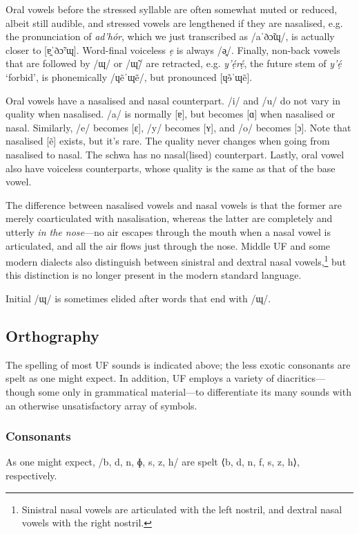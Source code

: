 \documentclass[a4paper, 12pt, twoside, final]{article}
\let \w \textit
\begin{document}
Oral vowels before the stressed syllable are often somewhat muted or reduced, albeit still audible, and stressed vowels are lengthened if they
are nasalised, e.g. the pronunciation of \w{ad’hór}, which we just transcribed as /aˈðɔ̃ɰ/, is actually closer to [ɐ̯ˈðɔ̃ˑɰ].
Word-final voiceless \w{ẹ} is always /ə̥/. Finally, non-back vowels that are followed by /ɰ/ or /ɰ̃/ are retracted, e.g. \w{y’ẹ́rẹ́}, the future
stem of \w{y’ẹ́} ‘forbid’, is phonemically /ɥẽˈɰẽ/, but pronounced [ɥɘ̃ˈɰẽ].

Oral vowels have a nasalised and nasal counterpart. /i/ and /u/ do not vary in quality when na\-sa\-lis\-ed.
/a/ is normally [ɐ], but becomes [ɑ] when nasalised or nasal. Similarly, /e/ becomes [ɛ],
/y/ becomes [ʏ], and /o/ becomes [ɔ]. Note that nasalised [ẽ] exists, but it’s
rare. The quality never changes when going from nasalised to nasal. The schwa has no nasal(lised) counterpart. Lastly, oral vowel
also have voiceless counterparts, whose quality is the same as that of the base vowel.

The difference between nasalised vowels and nasal vowels is that the former are merely coarticulated with nasalisation, whereas
the latter are completely and utterly \textit{in the nose}—no air escapes through the mouth when a nasal vowel is articulated, and all
the air flows just through the nose. Middle UF and some modern dialects also distinguish between sinistral and dextral nasal
vowels,\footnote{Sinistral nasal vowels are articulated with the left nostril, and dextral nasal vowels with the right nostril.}
but this distinction is no longer present in the modern standard language.

Initial /ɰ/ is sometimes elided after words that end with /ɰ/.

\subsection{Orthography}
The spelling of most UF sounds is indicated above; the less exotic consonants are spelt as
one might expect. In addition, UF employs a variety of diacritics—though some only in grammatical
material—to differentiate its many sounds with an otherwise unsatisfactory array of symbols.

\subsubsection{Consonants}
As one might expect, /b, d, n, ɸ, s, z, h/ are spelt ⟨b, d, n, f, s, z, h⟩, respectively.
\end{document}
